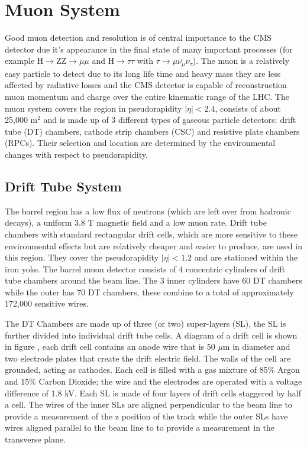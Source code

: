 \section{Muon System}
Good muon detection and resolution is of central importance 
to the CMS detector due it's appearance in the final state of many important processes
(for example H$\rightarrow$ZZ$\rightarrow\mu\mu$ and H$\rightarrow\tau\tau$ 
with $\tau\rightarrow\mu\overbar{\nu_{\mu}}\nu_{\tau}$). 
The muon is a relatively easy particle to detect due to its long life time 
and heavy mass they are less affected by radiative losses and the
CMS detector is capable of reconstruction muon momentum and charge over the entire
kinematic range of the LHC. The muon system covers the region in pseudorapidity
$|\eta|<2.4$, consists of about 25,000 m$^{2}$ and is made up of 3
 different types of gaseous particle detectors: drift tube (DT) chambers, 
 cathode strip chambers (CSC) and resistive plate chambers (RPCs).
 Their selection and location are determined by the environmental
 changes with respect to pseudorapidity. %
 
\subsection{Drift Tube System}
The barrel region has a low flux of neutrons (which are left over 
from hadronic decays), a uniform 3.8 T magnetic field and a low 
muon rate. Drift tube chambers with standard rectangular drift cells, 
which are more sensitive to  these environmental effects but are %
relatively cheaper and easier to produce, are used in this region. 
They cover the pseudorapidity $|\eta|<1.2$ and are stationed within 
the iron yoke. The barrel muon detector consists of 4 concentric
cylinders of drift tube chambers around the beam line. The 3 inner
cylinders have 60 DT chambers while the outer has 70 DT chambers,
these combine to a total of approximately 172,000 sensitive wires.

The DT Chambers are made up of three (or two) super-layers (SL), the 
SL is further divided into individual drift tube cells. 
A diagram of a drift cell is shown in figure ,%
each drift cell contains an anode wire that is 50 $\mu$m in diameter
and two electrode plates that create the drift electric field. The walls
of the cell are grounded, acting as cathodes. Each cell is filled with a gas
mixture of 85\% Argon and 15\% Carbon Dioxide; the wire and the
electrodes are operated with a voltage difference of 1.8 kV. Each
SL is made of four layers of drift cells staggered by half a cell.
The wires of the inner SLs are aligned perpendicular to the beam line
to provide a measurement of the z position of the track while the 
outer SLs have wires aligned parallel to the beam line to 
to provide a measurement in the transverse plane. 

